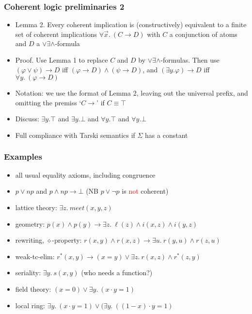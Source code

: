 \documentclass[handout,11pt]{beamer}
\newcommand{\red}[1]{\textcolor{red}{#1}}
\newcommand{\deca}{${\lor}{\exists}{\land}$}
\begin{document}
\begin{frame}
\frametitle{Coherent logic preliminaries 2}
 \begin{itemize}[<+->]   %
    \item Lemma 2. Every coherent implication is (constructively) 
    equivalent to a finite set of coherent implications
    $\forall\vec{x}.~(C \to D)$ 
    with $C$ a conjunction of atoms and $D$ a \deca-formula
    \item Proof. Use Lemma 1 to replace $C$ and $D$ by \deca-formulas.
    Then use $(\varphi\lor\psi)\to D$ iff $(\varphi\to D)\land(\psi\to D)$,
    and $(\exists y.\varphi)\to D$ iff $\forall y.~(\varphi\to D)$
    \item Notation: we use the format of Lemma 2, 
    leaving out the universal prefix, and omitting the premiss `$C\to{}$' 
    if $C\equiv\top$
    \item Discuss: $\exists y.\top$ and $\exists y.\bot$ and
    $\forall y.\top$ and $\forall y.\bot$
    \item Full compliance with Tarski semantics if $\Sigma$ has a constant
 \end{itemize}
\end{frame}

\begin{frame}
\frametitle{Examples}
 \begin{itemize}[<+->]   %
    \item all usual equality axioms, including congruence
    \item $p\lor np$ and $p\land np\to\bot$ 
    (NB $p\lor\neg p$ is \red{not} coherent)
    \item lattice theory: $%
    \exists z.~\mathit{meet}(x,y,z)$
    \item geometry: $%
    p(x)\land p(y) \to \exists z.~\ell(z) \land i(x,z) \land i(y,z)$
    \item rewriting, $\diamond$-property: $%
    r(x,y)\land r(x,z) \to \exists u.~r(y,u)\land r(z,u)$
    \item weak-tc-elim: $%
    r^*(x,y)\to (x=y)\lor\exists z.~r(x,z)\land r^*(z,y)$     
    \item seriality: $%
    \exists y.~s(x,y)$ (who needs a function?)
    \item field theory: $%
    (x=0) \lor \exists y.~(x\cdot y=1)$
    \item local ring: 
    $\exists y.~(x\cdot y = 1) \lor (\exists y.~((1-x)\cdot y = 1)$
 \end{itemize}
\end{frame}
\end{document}

